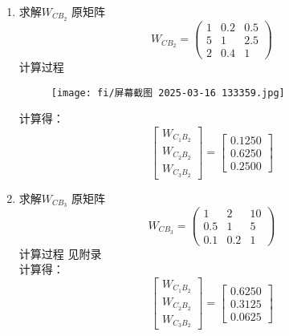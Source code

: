 \documentclass{article}
\begin{document}
\begin{enumerate}[(1)]
\item 求解$W_{CB_2}$
    原矩阵
 \[
 W_{CB_2} = \begin{pmatrix}
 1 & 0.2 & 0.5 \\
 5& 1  & 2.5 \\
 2 & 0.4  & 1
 \end{pmatrix}
 \]
 计算过程
    \begin{figure}[h]
        \centering
        \texttt{[image: fi/屏幕截图 2025-03-16 133359.jpg]}
    \end{figure}
 计算得：
    \begin{equation}
        \left[
        \begin{array}{c}
        W_{C_1B_2} \\
        W_{C_2B_2} \\
        W_{C_3B_2}
        \end{array}
        \right]
        =
        \left[
        \begin{array}{c}
        0.1250\\ 
        0.6250 \\
        0.2500
        \end{array}
        \right]
        \end{equation}
    \item 求解$W_{CB_3}$
    原矩阵
    \[
    W_{CB_3} = \begin{pmatrix}
        1 & 2 & 10 \\
        0.5& 1  & 5 \\
        0.1 & 0.2  & 1
        \end{pmatrix}
    \]
    计算过程
    见附录
    \\计算得：
        \begin{equation}
            \left[
            \begin{array}{c}
            W_{C_1B_2} \\
            W_{C_2B_2} \\
            W_{C_3B_2}
            \end{array}
            \right]
            =
            \left[
            \begin{array}{c}
            0.6250\\ 
            0.3125 \\
            0.0625
            \end{array}
            \right]
        \end{equation}
   

        
\end{enumerate}
\end{document}
